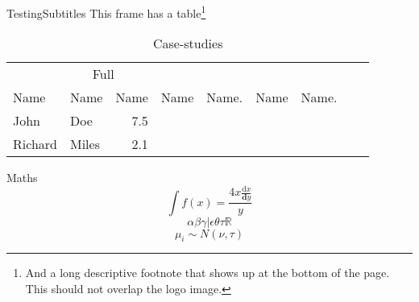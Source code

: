 \documentclass[xcolor={table}]{beamer}
\begin{document}
 \begin{frame}{Testing}{Subtitles}
This frame has a table\footnote{And a long descriptive footnote that shows up at the bottom 
of the page. This should not overlap the logo image.}

\begin{table}[htbp]
\caption{Case-studies}
\centering
\begin{tabular}{llrllllll}
\toprule
\multicolumn{4}{c}{Full}  \\

\cmidrule(r){4-5}
\cmidrule(r){6-7}

Name & Name & Name & Name & Name. & Name & Name.  \\
\midrule
John & Doe & 7.5 \\
Richard & Miles & 2.1\\
\bottomrule
\end{tabular}
\label{case-studies}
\end{table}


 \end{frame}


 \begin{frame}{Maths}
$$
\int f(x) = \frac{4x \frac{\mathrm{d}x}{\textbf{d}y}}{y} 
$$
$$
\alpha\beta\gamma|\epsilon\theta\tau \mathbb{R}
$$
$$
\mu_i \sim  N \left(\nu,\tau\right)
$$
 \end{frame}
\end{document}
